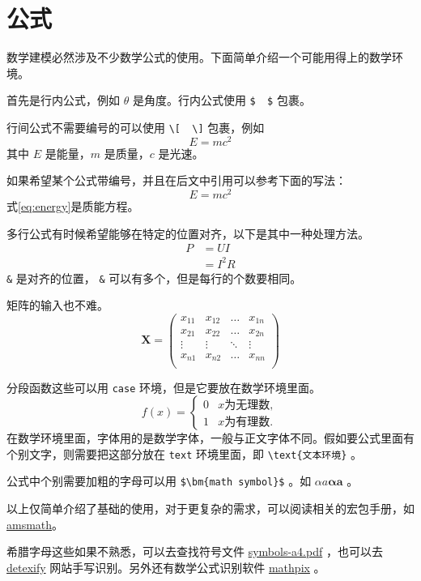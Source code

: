 \documentclass[withoutpreface,bwprint]{cumcmthesis} %
\numberwithin{equation}{subsection}
\begin{document}
\section{公式}

数学建模必然涉及不少数学公式的使用。下面简单介绍一个可能用得上的数学环境。

首先是行内公式，例如 $ \theta $ 是角度。行内公式使用 \verb|$  $| 包裹。

行间公式不需要编号的可以使用 \verb|\[  \]| 包裹，例如
\[
E=mc^2
\]
其中 $ E $ 是能量，$ m $ 是质量，$ c $ 是光速。

如果希望某个公式带编号，并且在后文中引用可以参考下面的写法：
\begin{equation}
E=mc^2
\label{eq:energy}
\end{equation}
式\cref{eq:energy}是质能方程。

多行公式有时候希望能够在特定的位置对齐，以下是其中一种处理方法。
\begin{align}
P & = UI \\
& = I^2R
\end{align}
\verb|&| 是对齐的位置， \verb|&| 可以有多个，但是每行的个数要相同。

矩阵的输入也不难。
\[
\mathbf{X} = \left(
    \begin{array}{cccc}
    x_{11} & x_{12} & \ldots & x_{1n}\\
    x_{21} & x_{22} & \ldots & x_{2n}\\
    \vdots & \vdots & \ddots & \vdots\\
    x_{n1} & x_{n2} & \ldots & x_{nn}\\
    \end{array} \right)
\]

分段函数这些可以用 \verb|case| 环境，但是它要放在数学环境里面。
\[
f(x) =
    \begin{cases}
        0 &  x \text{为无理数} ,\\
        1 &  x \text{为有理数} .
    \end{cases}
\]
在数学环境里面，字体用的是数学字体，一般与正文字体不同。假如要公式里面有个别文字，则需要把这部分放在 \verb|text| 环境里面，即 \verb|\text{文本环境}| 。

公式中个别需要加粗的字母可以用 \verb|$\bm{math symbol}$| 。如 $ \alpha a\bm{\alpha a} $ 。

以上仅简单介绍了基础的使用，对于更复杂的需求，可以阅读相关的宏包手册，如 \href{http://texdoc.net/texmf-dist/doc/latex/amsmath/amsldoc.pdf}{amsmath}。

希腊字母这些如果不熟悉，可以去查找符号文件 \href{http://mirrors.ctan.org/info/symbols/comprehensive/symbols-a4.pdf}{symbols-a4.pdf} ，也可以去 \href{http://detexify.kirelabs.org/classify.html}{detexify} 网站手写识别。另外还有数学公式识别软件 \href{https://mathpix.com/}{mathpix} 。
\end{document}
